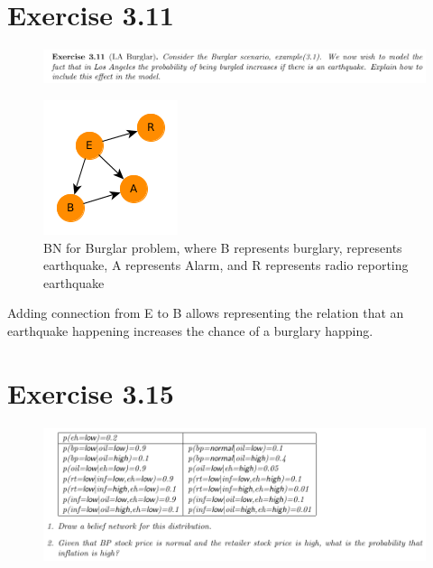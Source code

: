 \documentclass[paper=a4, fontsize=11pt]{scrartcl} %
\title{\hmwkClass \\
       \hmwkTitle}
\author{\hmwkAuthorFullName}
\date{\hmwkDueDate}
\begin{document}
    \maketitle
    \thispagestyle{fancy} %

\section*{Exercise 3.11}

    \begin{figure}[H]
        \centering
        \includegraphics[width=\linewidth]{../images/barber_ex3-11_problem.png}
    \end{figure}

    \begin{figure}[H]
        \centering
        \includegraphics[width=0.3\linewidth]{../images/barber_ex3-11.png}
        \caption{BN for Burglar problem, where B represents burglary, represents earthquake, A represents Alarm, and R represents radio reporting earthquake}
    \end{figure}

    Adding connection from E to B allows representing the relation that an earthquake happening increases the chance of a burglary happing.

\section*{Exercise 3.15}

    \begin{figure}[H]
        \centering
        \includegraphics[width=\linewidth]{../images/barber_ex3-15_problem.png}
    \end{figure}
\end{document}
